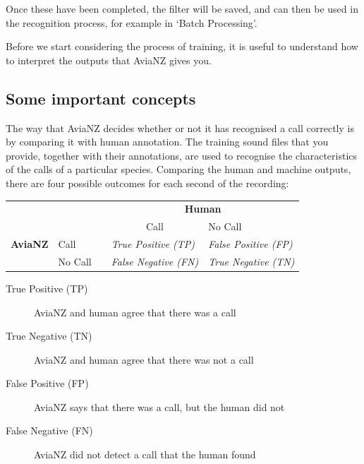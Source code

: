 \documentclass{article}
\begin{document}
Once these have been completed, the filter will be saved, and can then be used in the recognition process, for example in `Batch Processing'. 

Before we start considering the process of training, it is useful to understand how to interpret the outputs that AviaNZ gives you. 

\subsection{Some important concepts}\label{sec:metrics}

The way that AviaNZ decides whether or not it has recognised a call correctly is by comparing it with human annotation. The training sound files that you provide, together with their annotations, are used to recognise the characteristics of the calls of a particular species. Comparing the human and machine outputs, there are four possible outcomes for each second of the recording:

\begin{center}
\begin{tabular}{lllll}
&          &  & \multicolumn{2}{c}{\textbf{Human}}   \\
\cmidrule(lr){4-5}
             &          &  & \multicolumn{1}{c}{Call}                                               & No Call                                                               \\
 \textbf{AviaNZ}                  &\vline \hspace{0.25cm}Call     &  & \textit{True Positive (TP)}  & \textit{False Positive (FP)} \\
                  &\vline \hspace{0.25cm}No Call &  & \textit{False Negative (FN)} & \textit{True Negative (TN)}  \\
\end{tabular}
\end{center}

\begin{description}
\item[True Positive (TP)] AviaNZ and human agree that there was a call 
\item[True Negative (TN)] AviaNZ and human agree that there was not a call
\item[False Positive (FP)] AviaNZ says that there was a call, but the human did not
\item[False Negative (FN)] AviaNZ did not detect a call that the human found
\end{description}
\end{document}
